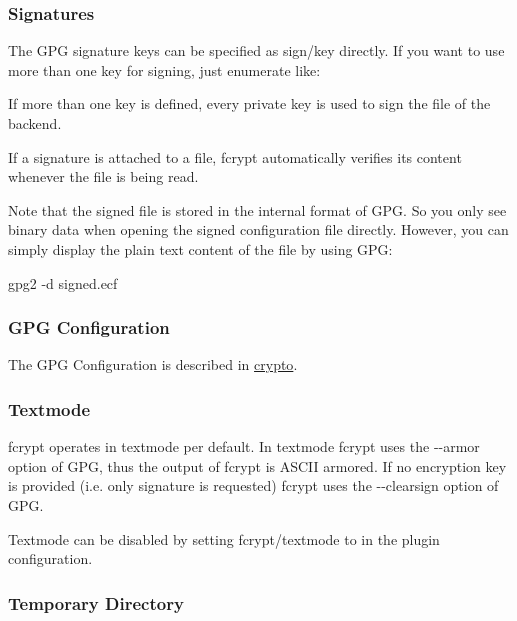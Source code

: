 \subsubsection*{Signatures}

The G\+PG signature keys can be specified as {\ttfamily sign/key} directly. If you want to use more than one key for signing, just enumerate like\+: 


If more than one key is defined, every private key is used to sign the file of the backend.

If a signature is attached to a file, {\ttfamily fcrypt} automatically verifies its content whenever the file is being read.

Note that the signed file is stored in the internal format of G\+PG. So you only see binary data when opening the signed configuration file directly. However, you can simply display the plain text content of the file by using G\+PG\+: \begin{DoxyVerb}gpg2 -d signed.ecf
\end{DoxyVerb}


\subsubsection*{G\+PG Configuration}

The G\+PG Configuration is described in \hyperlink{md_src_plugins_crypto_README_src_plugins_crypto_README_md}{crypto}.

\subsubsection*{Textmode}

{\ttfamily fcrypt} operates in textmode per default. In textmode {\ttfamily fcrypt} uses the {\ttfamily -\/-\/armor} option of G\+PG, thus the output of {\ttfamily fcrypt} is A\+S\+C\+II armored. If no encryption key is provided (i.\+e. only signature is requested) {\ttfamily fcrypt} uses the {\ttfamily -\/-\/clearsign} option of G\+PG.

Textmode can be disabled by setting {\ttfamily fcrypt/textmode} to {} in the plugin configuration.

\subsubsection*{Temporary Directory}

